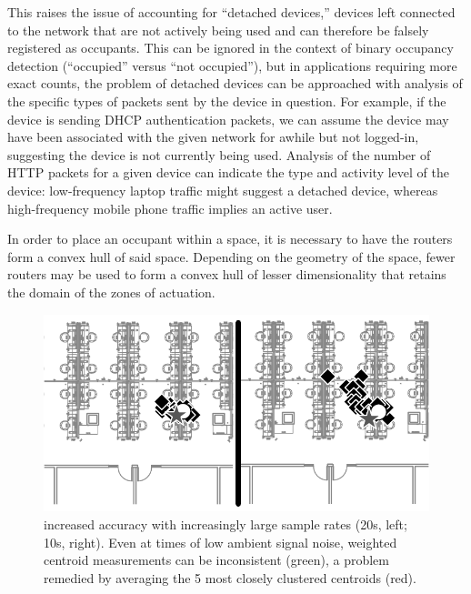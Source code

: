This raises the issue of accounting for ``detached devices,'' devices left connected to the network that are not actively being used and can therefore be falsely registered as occupants. This can be ignored in the context of binary occupancy detection (``occupied'' versus ``not occupied''), but in applications requiring more exact counts, the problem of detached devices can be approached with analysis of the specific types of packets sent by the device in question. For example, if the device is sending DHCP authentication packets, we can assume the device may have been associated with the given network for awhile but not logged-in, suggesting the device is not currently being used. Analysis of the number of HTTP packets for a given device can indicate the type and activity level of the device: low-frequency laptop traffic might suggest a detached device, whereas high-frequency mobile phone traffic implies an active user.

In order to place an occupant within a space, it is necessary to have the routers form a convex hull of said space. Depending on the geometry of the space, fewer routers may be used to form a convex hull of lesser dimensionality that retains the domain of the zones of actuation. 

\begin{figure}[htb]
\begin{center}
\includegraphics[width=.6\linewidth]{figs/samplesize}
\end{center}
\caption{increased accuracy with increasingly large sample rates (20s, left; 10s, right). Even at times of low ambient signal noise, weighted centroid measurements can be inconsistent (green), a problem remedied by averaging the 5 most closely clustered centroids (red).}
\end{figure}

